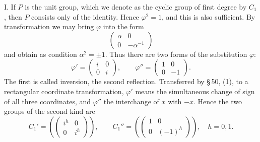 \documentclass[11pt]{article}
\begin{document}
I. If $P$ is the unit group, which we denote as the cyclic group of first degree by $C_1$, then $P$ consists only of the identity. Hence $\varphi^2=1$, and this is also sufficient. By transformation we may bring $\varphi$ into the form
\[
 \begin{pmatrix}\alpha&0\\0&-\alpha^{-1}\end{pmatrix}
\]
and obtain as condition $\alpha^2=\pm1$. Thus there are two forms of the substitution $\varphi$:
\[
 \varphi'=\begin{pmatrix}i&0\\0&i\end{pmatrix},\qquad
 \varphi''=\begin{pmatrix}1&0\\0&-1\end{pmatrix}.
\]
The first is called inversion, the second reflection. Transferred by \S\,50, (1), to a rectangular coordinate transformation, $\varphi'$ means the simultaneous change of sign of all three coordinates, and $\varphi''$ the interchange of $x$ with $-x$. Hence the two groups of the second kind are
\begin{equation}
 C_1'=\left(\begin{pmatrix}i^h&0\\0&i^h\end{pmatrix}\right),\qquad
 C_1''=\left(\begin{pmatrix}1&0\\0&(-1)^h\end{pmatrix}\right),
 \quad h=0,1. \tag{2}
\end{equation}
\end{document}
